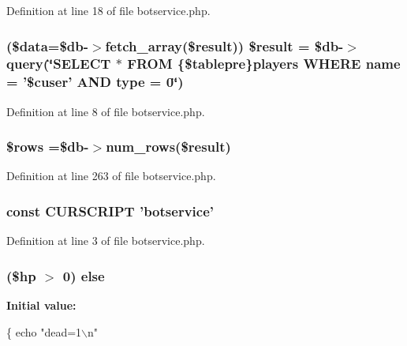 Definition at line 18 of file botservice.\+php.

\hypertarget{botservice_8php_ad72f7f7d7fd8794ce58b3da8977b8555}{
\subsubsection[{\$result}]{ (\$data=\$db-\/$>$fetch\+\_\+array(\${\bf result})) \${\bf result} = \$db-\/$>$query(\char`\"{}S\+E\+L\+E\+C\+T $\ast$ F\+R\+O\+M \{\$tablepre\}players W\+H\+E\+R\+E name = '\$cuser' A\+N\+D type = 0\char`\"{})}}\label{botservice_8php_ad72f7f7d7fd8794ce58b3da8977b8555}


Definition at line 8 of file botservice.\+php.

\hypertarget{botservice_8php_ace2ec39e7df3899fa8df9640ec274b03}{
\subsubsection[{\$rows}]{\setlength{\rightskip}{0pt plus 5cm}\$rows =\$db-\/$>$num\+\_\+rows(\${\bf result})}}\label{botservice_8php_ace2ec39e7df3899fa8df9640ec274b03}


Definition at line 263 of file botservice.\+php.

\hypertarget{botservice_8php_a39c39f525eceb86cabc338804f230e80}{
\subsubsection[{C\+U\+R\+S\+C\+R\+I\+P\+T}]{\setlength{\rightskip}{0pt plus 5cm}const C\+U\+R\+S\+C\+R\+I\+P\+T 'botservice'}}\label{botservice_8php_a39c39f525eceb86cabc338804f230e80}


Definition at line 3 of file botservice.\+php.

\hypertarget{botservice_8php_a0b84dc7d8563744402546248257bb26a}{
\subsubsection[{else}]{ (\$hp $>$ 0) else}}\label{botservice_8php_a0b84dc7d8563744402546248257bb26a}
{\bfseries Initial value\+:}
\begin{DoxyCode}
\{
    echo \textcolor{stringliteral}{"dead=1\(\backslash\)n"}
\end{DoxyCode}


